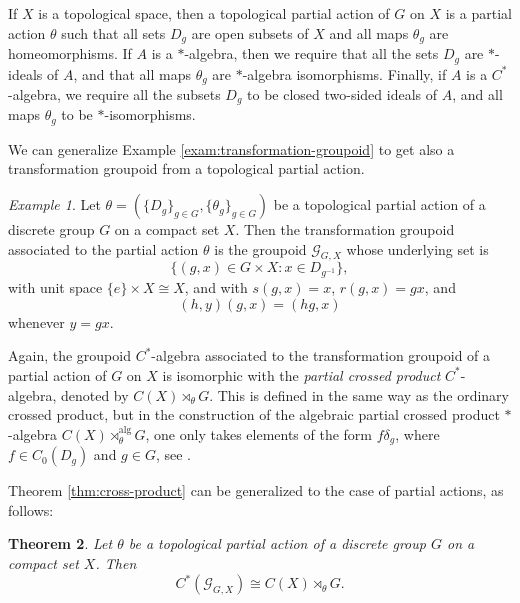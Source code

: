 \documentclass[11pt]{amsart}
\newcommand{\alrtimes}{\rtimes^{\mathrm{alg}}}
\theoremstyle{plain}            %
\newtheorem{theorem}{Theorem}[section]
\theoremstyle{definition}       %
\theoremstyle{definition}       %
\theoremstyle{remark}
\newtheorem{example}[theorem]{Example}
\begin{document}
If $X$ is a topological space, then a topological partial action of $G$ on $X$ is a partial action $\theta$ such that all sets $D_g$ are open subsets of $X$ and all maps $\theta_g$ are homeomorphisms. 
If $A$ is a $*$-algebra, then we require that all the sets $D_g$ are $*$-ideals of $A$, and that all maps $\theta_g$ are $*$-algebra isomorphisms. Finally, if $A$ is a $C^*$-algebra, we require all the subsets $D_g$ to be closed two-sided ideals of $A$, and all maps $\theta_g$ to be $*$-isomorphisms. 


We can generalize Example \ref{exam:transformation-groupoid} to get also a transformation groupoid from a topological partial action.


\begin{example}
	\label{exam:partialtransformation-groupoid}
	Let $\theta = (\{D_g\}_{g\in G}, \{\theta_g\}_{g\in G})$ be a topological partial action of a discrete group $G$ on a compact set $X$. Then the transformation groupoid associated to the partial action $\theta$ is the groupoid 
	$\mathcal G_{G,X}$ whose underlying set is  
	$$\{ (g,x)\in G\times X : x\in D_{g^{-1}}\},$$ 
	with unit space $\{e\}\times X\cong X$, and with  $s(g,x) = x$, $r(g,x)= gx$, and
	$$(h,y) (g,x) = (hg,x)$$
	whenever $y=gx$.  
\end{example}

Again, the groupoid $C^*$-algebra associated to the transformation groupoid of a partial action of $G$ on $X$ is isomorphic with the {\it partial crossed product} $C^*$-algebra, denoted by $C(X)\rtimes_\theta G$. This is defined in the same way as the ordinary crossed product, but in the construction of 
the algebraic partial crossed product  $*$-algebra $C(X)\alrtimes_\theta G$, one only takes elements of the form $f\delta_g$, where $f\in C_0(D_g)$ and $g \in G$, see \cite[Chapters 8 and 11]{ExelBook}. 

Theorem \ref{thm:cross-product} can be generalized to the case of partial actions, as follows:

\begin{theorem}{\rm \cite{Abadie}}
	\label{thm:partial-cross-product}
	Let $\theta$ be a topological partial action of a discrete group $G$ on a compact set $X$. Then 
	$$C^*(\mathcal G_{G,X} ) \cong C(X)\rtimes_\theta G.$$
\end{theorem}
\end{document}

